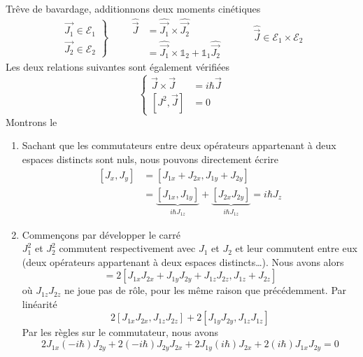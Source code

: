 Trêve de bavardage, additionnons deux moments cinétiques
\begin{equation}
\left.\begin{array}{ll}
\vec{J_1}\in\mathcal{E}_1\\
\vec{J_2}\in\mathcal{E}_2
\end{array}\right\}\qquad \begin{array}{ll}
\hat{\vec{J}} &= \hat{\vec{J_1}}\times\hat{\vec{J_2}}\\
&= \hat{\vec{J_1}}\times\mathbb{1}_2+\mathbb{1}_1\hat{\vec{J_2}}
\end{array}\qquad\quad \hat{\vec{J}} \in \mathcal{E}_1\times\mathcal{E}_2
\end{equation}
Les deux relations suivantes sont également vérifiées
\begin{equation}
\left\{\begin{array}{ll}
\vec{J}\times\vec{J} &= i\hbar\vec{J}\\
\left[J^2,\vec{J}\right] &=0
\end{array} \right.
\end{equation}
Montrons le 
\begin{enumerate}
\item Sachant que les commutateurs entre deux opérateurs appartenant à deux espaces distincts 
sont nuls, nous pouvons directement écrire 
 \begin{equation}
\begin{array}{ll}
[J_x,J_y] &= [J_{1x}+J_{2x}, J_{1y}+J_{2y}]\\
&= \underbrace{[J_{1x},J_{1y}]}_{i\hbar J_{1z}} +\underbrace{[J_{2x}J_{2y}]}_{i\hbar J_{1z}} 
= i\hbar J_z
\end{array}
\end{equation}
\item Commençons par développer le carré
\begin{equation}
[J_1^2 + 2J_1J_2 + J_2^2, J_{1z}+J_{2z}]
\end{equation}
$J_1^2$ et $J_2^2$ commutent respectivement avec $J_1$ et $J_2$ et leur commutent entre eux 
(deux opérateurs appartenant à deux espaces distincts\dots). Nous avons alors
\begin{equation}
[2J_1J_2] = 2[J_{1x}J_{2x}+J_{1y}J_{2y}+J_{1z}J_{2z}, J_{1z}+J_{2z}]
\end{equation}
où $J_{1z}J_{2z}$ ne joue pas de rôle, pour les même raison que précédemment. Par linéarité
\begin{equation}
2[J_{1x}J_{2x},J_{1z}J_{2z}] + 2[J_{1y}J_{2y}, J_{1z}J_{1z}]
\end{equation}
Par les règles sur le commutateur, nous avons 
\begin{equation}
2J_{1x}(-i\hbar)J_{2y} + 2(-i\hbar)J_{2y}J_{2x} + 2J_{1y}(i\hbar)J_{2x}+2(i\hbar)J_{1x}J_{2y} = 0
\end{equation}
\end{enumerate}

